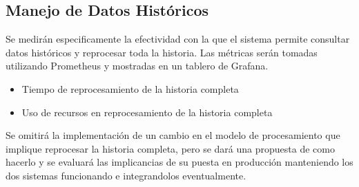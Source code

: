 \subsection{Manejo de Datos Históricos}

Se medirán especificamente la efectividad con la que el sistema permite consultar datos históricos y reprocesar toda la historia.
Las métricas serán tomadas utilizando Prometheus y mostradas en un tablero de Grafana.

\begin{itemize}
    \item Tiempo de reprocesamiento de la historia completa
    \item Uso de recursos en reprocesamiento de la historia completa
\end{itemize}

Se omitirá la implementación de un cambio en el modelo de procesamiento que implique reprocesar la historia completa, 
pero se dará una propuesta de como hacerlo y se evaluará las implicancias de su puesta en producción manteniendo los dos sistemas funcionando e integrandolos eventualmente.